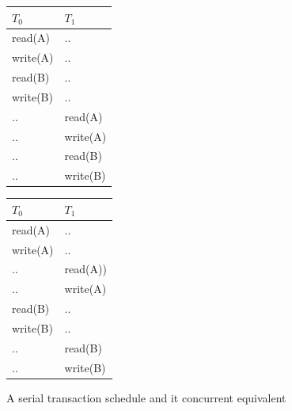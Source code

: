 \documentclass[10pt,a4paper]{article}
\begin{document}
\begin{figure}
\caption{A serial transaction schedule and it concurrent equivalent}
\begin{center}
\begin{tabular}{| l | l | }
  \hline
  $T_0$ & $T_1$ \\ \hline
  read(A) & .. \\
  write(A) & .. \\
  read(B) & .. \\
  write(B)	& .. \\
  .. & read(A) \\
  .. & write(A) \\
  .. & read(B) \\
  .. & write(B) \\
  \hline
\end{tabular}
\begin{tabular}{| l | l | }
  \hline
  $T_0$ & $T_1$ \\ \hline
  read(A) & .. \\
  write(A) & .. \\
  .. & read(A)) \\
  .. & write(A) \\
  read(B) & .. \\
  write(B) & .. \\
  .. & read(B) \\
  .. & write(B) \\
  \hline
\end{tabular}
\label{sershedule}
\end{center}
\end{figure}
{}

\begin{center}
\end{center}
\end{document}
